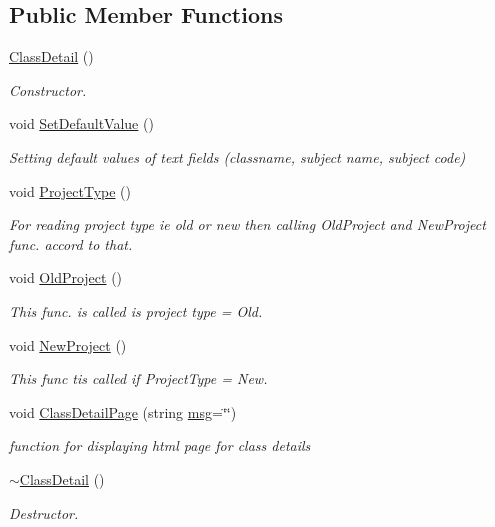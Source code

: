 \subsection*{\-Public \-Member \-Functions}
\begin{DoxyCompactItemize}
\item 
\hyperlink{classClassDetail_a70975c4ff964e21958e31f2020cdc643}{\-Class\-Detail} ()
\begin{DoxyCompactList}\small\item\em \-Constructor. \end{DoxyCompactList}\item 
void \hyperlink{classClassDetail_a2e2384f482bb2dca5f2d8a1c27491ae9}{\-Set\-Default\-Value} ()
\begin{DoxyCompactList}\small\item\em \-Setting default values of text fields (classname, subject name, subject code) \end{DoxyCompactList}\item 
void \hyperlink{classClassDetail_a360bb591c7b1559d1b6bac0609dbad1e}{\-Project\-Type} ()
\begin{DoxyCompactList}\small\item\em \-For reading project type ie old or new then calling \-Old\-Project and \-New\-Project func. accord to that. \end{DoxyCompactList}\item 
void \hyperlink{classClassDetail_af8cb05bf1c3d5581edddcdab96def081}{\-Old\-Project} ()
\begin{DoxyCompactList}\small\item\em \-This func. is called is project type = \-Old. \end{DoxyCompactList}\item 
void \hyperlink{classClassDetail_a521c8e315fa844a04932382ae85335bf}{\-New\-Project} ()
\begin{DoxyCompactList}\small\item\em \-This func tis called if \-Project\-Type = \-New. \end{DoxyCompactList}\item 
void \hyperlink{classClassDetail_a645fe4306391def818cdadbdc3febbf7}{\-Class\-Detail\-Page} (string \hyperlink{classInputDetail_a1abb16cd695678c3fa05e3c812823fee}{msg}=\char`\"{}\char`\"{})
\begin{DoxyCompactList}\small\item\em function for displaying html page for class details \end{DoxyCompactList}\item 
\hyperlink{classClassDetail_a2aeaf33b0a277a897aad308cffde211a}{$\sim$\-Class\-Detail} ()
\begin{DoxyCompactList}\small\item\em \-Destructor. \end{DoxyCompactList}\end{DoxyCompactItemize}
